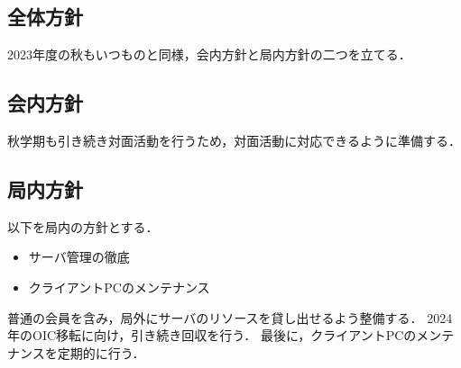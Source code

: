 \subsection*{全体方針}


2023年度の秋もいつものと同様，会内方針と局内方針の二つを立てる．

\subsection*{会内方針}
秋学期も引き続き対面活動を行うため，対面活動に対応できるように準備する．

\subsection*{局内方針}
以下を局内の方針とする．
\begin{itemize}
    \item サーバ管理の徹底
    \item クライアントPCのメンテナンス
\end{itemize}
普通の会員を含み，局外にサーバのリソースを貸し出せるよう整備する．
2024年のOIC移転に向け，引き続き回収を行う．
最後に，クライアントPCのメンテナンスを定期的に行う．
